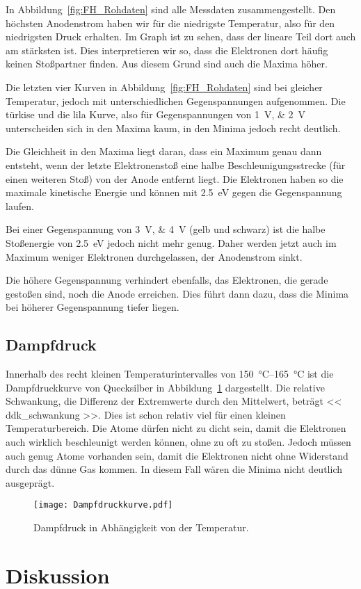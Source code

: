 In Abbildung~\ref{fig:FH_Rohdaten} sind alle Messdaten zusammengestellt. Den
höchsten Anodenstrom haben wir für die niedrigste Temperatur, also für den
niedrigsten Druck erhalten. Im Graph ist zu sehen, dass der lineare Teil dort
auch am stärksten ist. Dies interpretieren wir so, dass die Elektronen dort
häufig keinen Stoßpartner finden. Aus diesem Grund sind auch die Maxima höher.

Die letzten vier Kurven in Abbildung~\ref{fig:FH_Rohdaten} sind bei gleicher
Temperatur, jedoch mit unterschiedlichen Gegenspannungen aufgenommen. Die
türkise und die lila Kurve, also für Gegenspannungen von \SIlist{1;2}{\volt}
unterscheiden sich in den Maxima kaum, in den Minima jedoch recht deutlich.

Die Gleichheit in den Maxima liegt daran, dass ein Maximum genau dann entsteht,
wenn der letzte Elektronenstoß eine halbe Beschleunigungsstrecke (für einen
weiteren Stoß) von der Anode entfernt liegt. Die Elektronen haben so die
maximale kinetische Energie und können mit \SI{2.5}{\electronvolt} gegen die
Gegenspannung laufen.

Bei einer Gegenspannung von \SIlist{3;4}{\volt} (gelb und schwarz) ist die
halbe Stoßenergie von \SI{2.5}{\electronvolt} jedoch nicht mehr genug. Daher
werden jetzt auch im Maximum weniger Elektronen durchgelassen, der Anodenstrom
sinkt.

Die höhere Gegenspannung verhindert ebenfalls, das Elektronen, die gerade
gestoßen sind, noch die Anode erreichen. Dies führt dann dazu, dass die Minima
bei höherer Gegenspannung tiefer liegen.

\subsection{Dampfdruck}

Innerhalb des recht kleinen Temperaturintervalles von
\SIrange{150}{165}{\celsius} ist die Dampfdruckkurve von Quecksilber in
Abbildung~\ref{fig:Dampfdruckkurve} dargestellt. Die relative Schwankung, die
Differenz der Extremwerte durch den Mittelwert, beträgt \num{<< ddk_schwankung
>>}. Dies ist schon relativ viel für einen kleinen Temperaturbereich. Die Atome
dürfen nicht zu dicht sein, damit die Elektronen auch wirklich beschleunigt
werden können, ohne zu oft zu stoßen. Jedoch müssen auch genug Atome vorhanden
sein, damit die Elektronen nicht ohne Widerstand durch das dünne Gas kommen. In
diesem Fall wären die Minima nicht deutlich ausgeprägt.

\begin{figure}[htbp]
    \centering
    \texttt{[image: Dampfdruckkurve.pdf]}
    \caption{%
        Dampfdruck in Abhängigkeit von der Temperatur.
    }
    \label{fig:Dampfdruckkurve}
\end{figure}

\section{Diskussion}

\printbibliography



